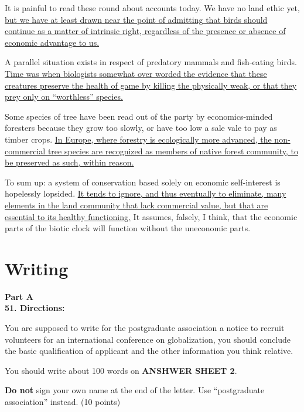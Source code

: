 It is painful to read these round about accounts today. We have no land
ethic yet, \transnum \uline{but we have at least drawn near the point of
	admitting that birds should continue as a matter of intrinsic right,
	regardless of the presence or absence of economic advantage to us.}

A parallel situation exists in respect of predatory mammals and
fish-eating birds. \transnum \uline{Time was when biologists somewhat
	over worded the evidence that these creatures preserve the health of
	game by killing the physically weak, or that they prey only on
	``worthless'' species.}

Some species of tree have been read out of the party by economics-minded
foresters because they grow too slowly, or have too low a sale vale to
pay as timber crops. \transnum \uline{In Europe, where forestry is
	ecologically more advanced, the non-commercial tree species are
	recognized as members of native forest community, to be preserved as
	such, within reason.}

To sum up: a system of conservation based solely on economic
self-interest is hopelessly lopsided. \transnum \uline{It tends to
	ignore, and thus eventually to eliminate, many elements in the land
	community that lack commercial value, but that are essential to its
	healthy functioning.} It assumes, falsely, I think, that the economic
parts of the biotic clock will function without the uneconomic parts.



\section{Writing}


\noindent
\textbf{Part A}\\
\textbf{51. Directions:}




You are supposed to write for the postgraduate association a notice to
recruit volunteers for an international conference on globalization, you
should conclude the basic qualification of applicant and the other
information you think relative.

You should write about 100 words on \textbf{ANSHWER SHEET 2}.

 \textbf{Do not} sign your own name at
the end of the letter. Use ``postgraduate association'' instead. (10 points)



\vspace{2em}

